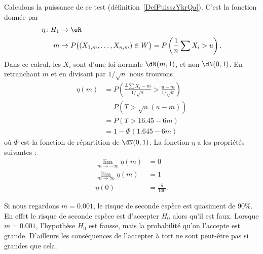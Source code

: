 Calculons la puissance de ce test (définition~\ref{DefPuisszYkrQa}). C'est la fonction donnée par
\begin{equation}
	\begin{aligned}
		\eta\colon H_1 & \to \eR                                                                                       \\
		m              & \mapsto P\big( (X_{1,m},\ldots, X_{n,m})\in W \big)=P\left( \frac{1}{ n }\sum X_i>u \right) .
	\end{aligned}
\end{equation}
Dans ce calcul, les \( X_i\) sont d'une loi normale \( \dN(m,1)\), et non \( \dN(0,1)\). En retranchant \( m\) et en divisant par \( 1/\sqrt{n}\) nous trouvons
\begin{subequations}
	\begin{align}
		\eta(m) & =P\left( \frac{ \frac{1}{ n }\sum X_i-m }{ 1/\sqrt{n} }>\frac{ u-m }{ 1/\sqrt{n} } \right) \\
		        & =P(T>\sqrt{n}(u-m))                                                                        \\
		        & =P(T>16.45-6m)                                                                             \\
		        & =1-\Phi(1.645-6m)
	\end{align}
\end{subequations}
où \( \Phi\) est la fonction de répartition de \( \dN(0,1)\). La fonction \( \eta\) a les propriétés suivantes :
\begin{subequations}
	\begin{align}
		\lim_{m\to-\infty}\eta(m) & =0                  \\
		\lim_{m\to\infty}\eta(m)  & =1                  \\
		\eta(0)                   & =\frac{ 5 }{ 100 }.
	\end{align}
\end{subequations}

\begin{remark}
	Si nous regardons \( m=0.001\), le risque de seconde espèce est quasiment de \( 90\%\). En effet le risque de seconde espèce est d'accepter \( H_0\) alors qu'il est faux. Lorsque \( m=0.001\), l'hypothèse \( H_0\) est fausse, mais la probabilité qu'on l'accepte est grande. D'ailleurs les conséquences de l'accepter à tort ne sont peut-être pas si grandes que cela.
\end{remark}

